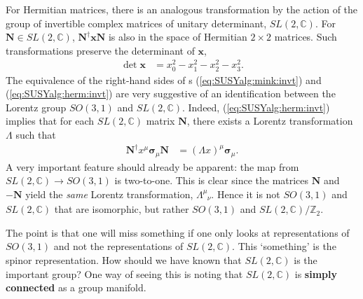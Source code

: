 For Hermitian matrices, there is an analogous transformation by the action of the group of invertible complex matrices of unitary determinant, $SL(2,\mathbb C)$. For $\mathbf N \in SL(2,\mathbb C)$, $\mathbf N^\dag \mathbf{x} \mathbf N$
is also in the space of Hermitian $2\times 2$ matrices. Such transformations preserve the determinant of $\mathbf x$,
\begin{align}
    \det \mathbf{x} &= x_0^2 - x_1^2 - x_2^2 - x_3^2.\label{eq:SUSYalg:herm:invt}
\end{align}
The equivalence of the right-hand sides of s (\ref{eq:SUSYalg:mink:invt}) and (\ref{eq:SUSYalg:herm:invt}) are very suggestive of an identification between the Lorentz group $SO(3,1)$ and $SL(2,\mathbb C)$. Indeed,  (\ref{eq:SUSYalg:herm:invt}) implies that for each $SL(2,\mathbb C)$ matrix $\mathbf N$, there exists a Lorentz transformation $\Lambda$ such that 
\begin{align}
    \mathbf{N^\dag} x^\mu \mathbf{\sigma}_\mu \mathbf{N} &= (\Lambda x)^\mu \mathbf{\sigma}_\mu.\label{eq:SUSYalg:SL2C:Lorentz}
\end{align}
A very 
important feature should already be apparent: the map from $SL(2,\mathbb C)\rightarrow SO(3,1)$ is two-to-one. This is clear since the matrices $\mathbf N$ and $-\mathbf N$ yield the \textit{same} Lorentz transformation, $\Lambda^\mu_{\phantom\mu\nu}$. Hence it is not $SO(3,1)$ and $SL(2,\mathbb C)$ that are isomorphic, but rather $SO(3,1)$ and $SL(2,\mathbb C)/\mathbb Z_2$.

The point is that one will miss something if one only looks at representations of $SO(3,1)$ and not the representations of $SL(2,\mathbb C)$. This `something' is the spinor representation. How should we have known that $SL(2,\mathbb C)$ is the important group? One way of seeing this is noting that $SL(2,\mathbb C)$ is \textbf{simply connected} as a group manifold.

